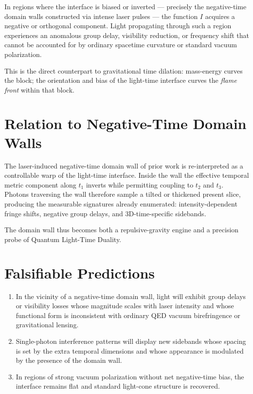 \documentclass[11pt,a4paper]{article}
\begin{document}
In regions where the interface is biased or inverted — precisely the negative-time domain walls constructed via intense laser pulses — the function $I$ acquires a negative or orthogonal component. Light propagating through such a region experiences an anomalous group delay, visibility reduction, or frequency shift that cannot be accounted for by ordinary spacetime curvature or standard vacuum polarization.

This is the direct counterpart to gravitational time dilation: mass-energy curves the block; the orientation and bias of the light-time interface curves the \textit{flame front} within that block.

\section{Relation to Negative-Time Domain Walls}

The laser-induced negative-time domain wall of prior work is re-interpreted as a controllable warp of the light-time interface. Inside the wall the effective temporal metric component along $t_1$ inverts while permitting coupling to $t_2$ and $t_3$. Photons traversing the wall therefore sample a tilted or thickened present slice, producing the measurable signatures already enumerated: intensity-dependent fringe shifts, negative group delays, and 3D-time-specific sidebands.

The domain wall thus becomes both a repulsive-gravity engine and a precision probe of Quantum Light-Time Duality.

\section{Falsifiable Predictions}

\begin{enumerate}
    \item In the vicinity of a negative-time domain wall, light will exhibit group delays or visibility losses whose magnitude scales with laser intensity and whose functional form is inconsistent with ordinary QED vacuum birefringence or gravitational lensing.
    \item Single-photon interference patterns will display new sidebands whose spacing is set by the extra temporal dimensions and whose appearance is modulated by the presence of the domain wall.
    \item In regions of strong vacuum polarization without net negative-time bias, the interface remains flat and standard light-cone structure is recovered.
\end{enumerate}
\end{document}
